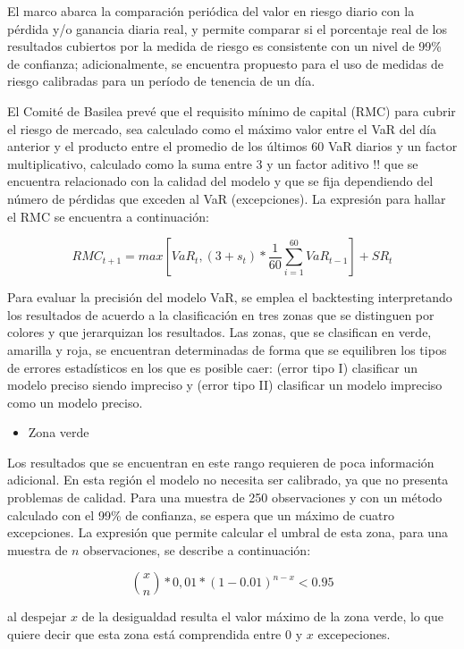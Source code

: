 \documentclass[
  12pt,
]{krantz}
\providecommand{\tightlist}{%
  \setlength{\itemsep}{0pt}\setlength{\parskip}{0pt}}
\begin{document}
El marco abarca la comparación periódica del valor en riesgo diario con la pérdida y/o ganancia diaria real, y permite comparar si el porcentaje real de los resultados cubiertos por la medida de riesgo es consistente con un nivel de 99\% de confianza; adicionalmente, se encuentra propuesto para el uso de medidas de riesgo calibradas para un período de tenencia de un día.

El Comité de Basilea prevé que el requisito mínimo de capital (RMC) para cubrir el riesgo de mercado, sea calculado como el máximo valor entre el VaR del día anterior y el producto entre el promedio de los últimos 60 VaR diarios y un factor multiplicativo, calculado como la suma entre 3 y un factor aditivo !! que se encuentra relacionado con la calidad del modelo y que se fija dependiendo del número de pérdidas que exceden al VaR (excepciones). La expresión para hallar el RMC se encuentra a continuación:

\[
RMC_{t+1} = max[VaR_t , (3+s_t)*\frac{1}{60}\sum_{i=1}^{60} VaR_{t-1} ]+SR_t
\]

Para evaluar la precisión del modelo VaR, se emplea el backtesting interpretando los resultados de acuerdo a la clasificación en tres zonas que se distinguen por colores y que jerarquizan los resultados. Las zonas, que se clasifican en verde, amarilla y roja, se encuentran determinadas de forma que se equilibren los tipos de errores estadísticos en los que es posible caer: (error tipo I) clasificar un modelo preciso siendo impreciso y (error tipo II) clasificar un modelo impreciso como un modelo preciso.

\begin{itemize}
\tightlist
\item
  Zona verde
\end{itemize}

Los resultados que se encuentran en este rango requieren de poca información adicional. En esta región el modelo no necesita ser calibrado, ya que no presenta problemas de calidad. Para una muestra de 250 observaciones y con un método calculado con el 99\% de confianza, se espera que un máximo de cuatro excepciones.
La expresión que permite calcular el umbral de esta zona, para una muestra de \(n\) observaciones, se describe a continuación:

\[
\binom{x}{n} * 0,01*(1-0.01)^{n-x} < 0.95
\]

al despejar \(x\) de la desigualdad resulta el valor máximo de la zona verde, lo que quiere decir que esta zona está comprendida entre 0 y \(x\) excepeciones.
\end{document}
